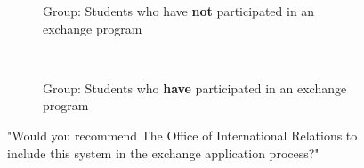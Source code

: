\begin{figure}[h]
    \centering
    \begin{subfigure}[b]{0.4\textwidth}
        
        \caption{Group: Students who have \textbf{not} participated in an exchange program}
        \label{fig:gull}
    \end{subfigure}
    ~ \qquad %
    \begin{subfigure}[b]{0.4\textwidth}
       
        \caption{Group: Students who \textbf{have} participated in an exchange program}
        \label{fig:tiger}
    \end{subfigure}
    \caption{"Would you recommend The Office of International Relations to include this system in the exchange application process?"}
\end{figure}


